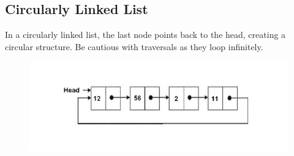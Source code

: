     \subsection{Circularly Linked List}
    In a circularly linked list, the last node points back to the head, creating a circular structure. Be cautious with traversals as they loop infinitely.
    \begin{figure}[h]
        \centering
        \includegraphics[width=0.8\linewidth]{immagini/circularly linked lists.JPG }
        \label{fig:enter-label}
    \end{figure}
    \newpage
